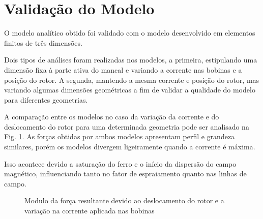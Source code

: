 \section{Validação do Modelo}

O modelo analítico obtido foi validado com o modelo desenvolvido em elementos finitos de três dimensões.

Dois tipos de análises foram realizadas nos modelos, a primeira, estipulando uma dimensão fixa à parte ativa do mancal e variando a corrente nas bobinas e a posição do rotor. A segunda, mantendo a mesma corrente e posição do rotor, mas variando algumas dimensões geométricas a fim de validar a qualidade do modelo para diferentes geometrias.

A comparação entre os modelos no caso da variação da corrente e do deslocamento do rotor para uma determinada geometria pode ser analisado na Fig. \ref{Fig:simulacoes:ativo:comparacao:dx:i}. As forças obtidas por ambos modelos apresentam perfil e grandeza similares, porém os modelos divergem ligeiramente quando a corrente é máxima.

Isso acontece devido a saturação do ferro e o início da dispersão do campo magnético, influenciando tanto no fator de espraiamento quanto nas linhas de campo. 

	\begin{figure}[!ht]
		
		\caption{Modulo da força resultante devido ao deslocamento do rotor e a variação na corrente aplicada nas bobinas}
		\label{Fig:simulacoes:ativo:comparacao:dx:i}
	\end{figure}

